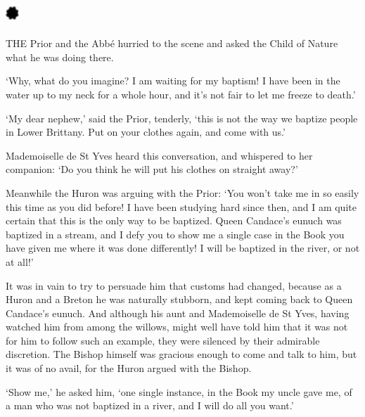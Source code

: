 \documentclass{article}
\begin{document}
\begin{center}
\section*{%
\includegraphics[width=14pt, height=15pt, keepaspectratio=true]{Zadig or L'Ingenu - Voltaire-fig026.jpg}
}

 

THE Prior and the Abbé hurried to the scene and asked the Child of Nature what 
he was doing there. 

`Why, what do you imagine? I am waiting for my baptism! I have been in the water 
up to my neck for a whole hour, and it's not fair to let me freeze to death.' 

`My dear nephew,' said the Prior, tenderly, `this is not the way we baptize people 
in Lower Brittany. Put on your clothes again, and come with us.' 

Mademoiselle de St Yves heard this conversation, and whispered to her companion: 
`Do you think he will put his clothes on straight away?' 

Meanwhile the Huron was arguing with the Prior: `You won't take me in so easily 
this time as you did before! I have been studying hard since then, and I am quite 
certain that this is the only way to be baptized. Queen Candace's eunuch was baptized 
in a stream, and I defy you to show me a single case in the Book you have given 
me where it was done differently! I will be baptized in the river, or not at all!' 

It was in vain to try to persuade him that customs had changed, because as a Huron 
and a Breton he was naturally stubborn, and kept coming back to Queen Candace's 
eunuch. And although his aunt and Mademoiselle de St Yves, having watched him from 
among the willows, might well have told him that it was not for him to follow such 
an example, they were silenced by their admirable discretion. The Bishop himself 
was gracious enough to come and talk to him, but it was of no avail, for the Huron 
argued with the Bishop. 

`Show me,' he asked him, `one single instance, in the Book my uncle gave me, of 
a man who was not baptized in a river, and I will do all you want.' 


\end{center}
\end{document}
